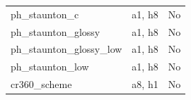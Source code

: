 \begin{longtable}{>{\raggedright\arraybackslash}p{.47\linewidth}>{\raggedright\arraybackslash}p{.25\linewidth}l}
ph\_\allowbreak{}staunton\_\allowbreak{}c & %
a1, h8 & %
No \\ %

ph\_\allowbreak{}staunton\_\allowbreak{}glossy & %
a1, h8 & %
No \\ %

ph\_\allowbreak{}staunton\_\allowbreak{}glossy\_\allowbreak{}low & %
a1, h8 & %
No \\ %

ph\_\allowbreak{}staunton\_\allowbreak{}low & %
a1, h8 & %
No \\ %

cr360\_\allowbreak{}scheme & %
a8, h1 & %
No \\ %


\end{longtable}
